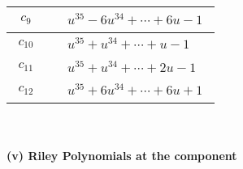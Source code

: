 \documentclass[1p]{elsarticle_modified}
\theoremstyle{definition}
\begin{document}
\begin{tabular}{m{50pt}|m{274pt}}
\hline $$\begin{aligned}c_{9}\end{aligned}$$&$\begin{aligned}
&u^{35}-6 u^{34}+\cdots+6 u-1
\end{aligned}$\\
\hline $$\begin{aligned}c_{10}\end{aligned}$$&$\begin{aligned}
&u^{35}+u^{34}+\cdots+u-1
\end{aligned}$\\
\hline $$\begin{aligned}c_{11}\end{aligned}$$&$\begin{aligned}
&u^{35}+u^{34}+\cdots+2 u-1
\end{aligned}$\\
\hline $$\begin{aligned}c_{12}\end{aligned}$$&$\begin{aligned}
&u^{35}+6 u^{34}+\cdots+6 u+1
\end{aligned}$\\
\hline
\end{tabular}\\~\\
\newpage\renewcommand{\arraystretch}{1}
\flushleft \textbf{(v) Riley Polynomials at the component}\newline \\
\end{document}
